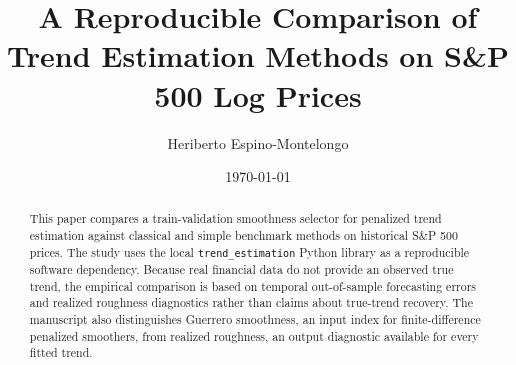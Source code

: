 \documentclass[11pt]{article}
\title{A Reproducible Comparison of Trend Estimation Methods on S\&P 500 Log Prices}
\author{Heriberto Espino-Montelongo}
\date{\today}
\newcommand{\paperroot}{}
\newcommand{\paperroot}{paper/}
\begin{document}
\maketitle

\begin{abstract}
This paper compares a train-validation smoothness selector for penalized trend
estimation against classical and simple benchmark methods on historical S\&P
500 prices. The study uses the local \texttt{trend\_estimation} Python library
as a reproducible software dependency. Because real financial data do not
provide an observed true trend, the empirical comparison is based on temporal
out-of-sample forecasting errors and realized roughness diagnostics rather than
claims about true-trend recovery. The manuscript also distinguishes Guerrero
smoothness, an input index for finite-difference penalized smoothers, from
realized roughness, an output diagnostic available for every fitted trend.
\end{abstract}












\end{document}
